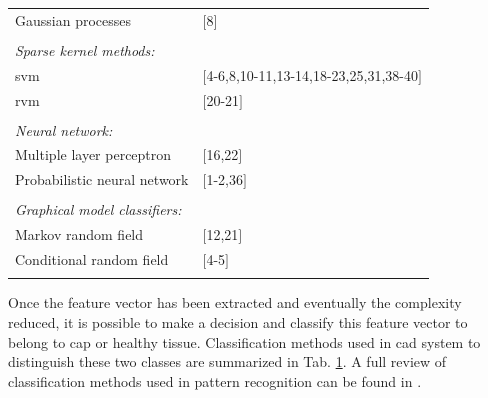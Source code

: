 \begin{table}
\begin{tabular}{p{.60\linewidth} p{.30\linewidth}}
		\quad Gaussian processes & $[$8$]$ \\ \\ [-1.5ex]
		\textit{Sparse kernel methods:} & \\
		\quad \acs{svm} & $[$4-6,8,10-11,13-14,18-23,25,31,38-40$]$ \\
		\quad \acs{rvm} & $[$20-21$]$ \\ \\ [-1.5ex]
		\textit{Neural network:} & \\ 
		\quad Multiple layer perceptron & $[$16,22$]$ \\
		\quad Probabilistic neural network & $[$1-2,36$]$ \\ \\ [-1.5ex]
		\textit{Graphical model classifiers:} & \\
		\quad Markov random field & $[$12,21$]$ \\
		\quad Conditional random field & $[$4-5$]$ \\ \\ [-1.5ex]
		\hline
	\end{tabular}
	\label{tab:class}
\end{table}

Once the feature vector has been extracted and eventually the complexity reduced, it is possible to make a decision and classify this feature vector to belong to \ac{cap} or healthy tissue. Classification methods used in \ac{cad} system to distinguish these two classes are summarized in Tab. \ref{tab:class}. A full review of classification methods used in pattern recognition can be found in \cite{Bishop2006}.

